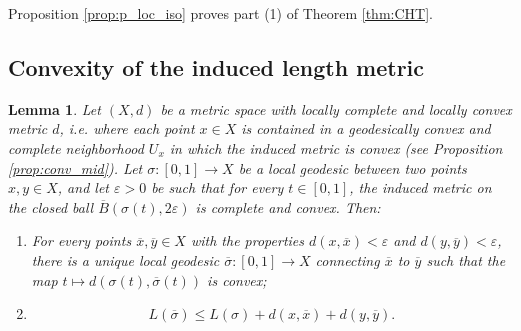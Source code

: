 \documentclass[11pt, a4paper, oneside]{memoir}
\theoremstyle{plain}\newtheorem{theorem}[subsection]{Theorem}
\newtheorem{lemma}[subsection]{Lemma}
\theoremstyle{definition}
\newcommand{\parenum}{\setenumerate[1]{label=\textbf{(\arabic*)}}}
\begin{document}
Proposition \ref{prop:p_loc_iso} proves part (1) of Theorem \ref{thm:CHT}.


\subsection{Convexity of the induced length metric}
\begin{lemma}\label{lem:induced_convex}
Let \((X,d)\) be a metric space with locally complete and locally convex metric \(d\), i.e. where each point \(x\in X\) is contained in a geodesically convex and complete neighborhood \(U_x\) in which the induced metric is convex (see Proposition \ref{prop:conv_mid}).
Let \(\sigma:[0,1]\to X\) be a local geodesic between two points \(x,y\in X\), and let \(\varepsilon>0\) be such that for every \(t\in[0,1]\), the induced metric on the closed ball \(\overline{B}(\sigma(t),2\varepsilon)\) is complete and convex.
Then:
\parenum\begin{enumerate}
    \item For every points \(\overline{x},\overline{y}\in X\) with the properties \(d(x,\overline{x})<\varepsilon\) and \(d(y,\overline{y})<\varepsilon\), there is a unique local geodesic \(\overline{\sigma}:[0,1]\to X\) connecting \(\overline{x}\) to \(\overline{y}\) such that the map \(t\mapsto d(\sigma(t),\overline{\sigma}(t))\) is convex;
    \item \[L(\overline{\sigma})\leq L(\sigma)+d(x,\overline{x})+d(y,\overline{y}).\]
\end{enumerate}
\end{lemma}
\end{document}
